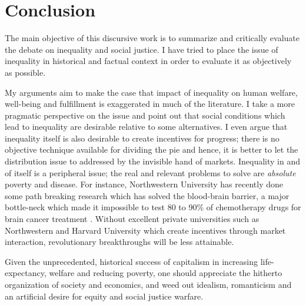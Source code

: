 \documentclass[12pt]{article}
\newcommand{\1}{\mathbbm 1}
\begin{document}
		
		
		
		
		
		
		
		
		
		
		
	
			
			
			
	
	 
		
		
	
		\section{Conclusion}
		
		
		The main objective of this discursive work is to summarize and critically evaluate the debate on inequality and social justice. I have tried to place the issue of inequality in historical and factual context in order to evaluate it as objectively as possible.
		
		My arguments aim to make the case that impact of inequality on human welfare, well-being and fulfillment is exaggerated in much of the literature. I take a more pragmatic perspective on the issue and point out that social conditions which lead to inequality are desirable relative to some alternatives. I even argue that inequality itself is also desirable to create incentives for progress; there is no objective technique available for dividing the pie and hence, it is better to let the distribution issue to addressed by the invisible hand of markets. Inequality in and of itself is a peripheral issue; the real and relevant problems to solve are \textit{absolute} poverty and disease. For instance, Northwestern University has recently done some path breaking research which has solved the blood-brain barrier, a major bottle-neck which made it impossible to test 80 to 90\% of chemotherapy drugs for brain cancer treatment \cite{schoen2022towards}. Without excellent private universities such as Northwestern and Harvard University which create incentives through market interaction, revolutionary breakthroughs will be less attainable.
		
		
		Given the unprecedented, historical success of capitalism in increasing life-expectancy, welfare and reducing poverty, one should appreciate the hitherto organization of society and economics, and weed out idealism, romanticism and an artificial desire for equity and social justice warfare.
		
	
		\newpage
		
		
\end{document}
